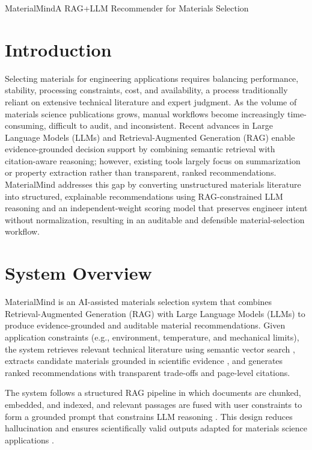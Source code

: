 \begin{teamsubmission}{MaterialMind}{A RAG+LLM Recommender for Materials Selection}
\section*{Introduction}
Selecting materials for engineering applications requires balancing performance, stability, processing constraints, cost, and availability, a process traditionally reliant on extensive technical literature and expert judgment. As the volume of materials science publications grows, manual workflows become increasingly time-consuming, difficult to audit, and inconsistent. Recent advances in Large Language Models (LLMs) and Retrieval-Augmented Generation (RAG) enable evidence-grounded decision support by combining semantic retrieval with citation-aware reasoning; however, existing tools largely focus on summarization or property extraction rather than transparent, ranked recommendations. MaterialMind addresses this gap by converting unstructured materials literature into structured, explainable recommendations using RAG-constrained LLM reasoning and an independent-weight scoring model that preserves engineer intent without normalization, resulting in an auditable and defensible material-selection workflow.
 
\section*{System Overview}

MaterialMind is an AI-assisted materials selection system that combines
Retrieval-Augmented Generation (RAG) with Large Language Models (LLMs) to
produce evidence-grounded and auditable material recommendations. Given
application constraints (e.g., environment, temperature, and mechanical
limits), the system retrieves relevant technical literature using semantic
vector search \cite{gao2023ragsurvey,yuan2024lamp}, extracts candidate
materials grounded in scientific evidence
\cite{cheng2025aidriven,zhou2025smalldata}, and generates ranked
recommendations with transparent trade-offs and page-level citations.

The system follows a structured RAG pipeline in which documents are chunked,
embedded, and indexed, and relevant passages are fused with user constraints
to form a grounded prompt that constrains LLM reasoning
\cite{gao2023ragsurvey,yuan2024lamp,xie2024darwin}. This design reduces
hallucination and ensures scientifically valid outputs adapted for materials
science applications \cite{cheng2025aidriven}.


\end{teamsubmission}
